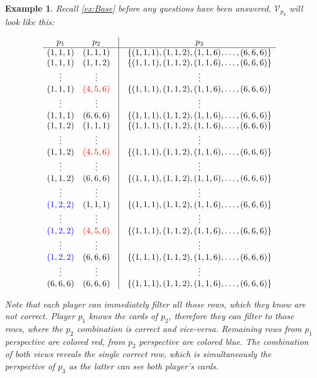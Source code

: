 \documentclass{article}
\newtheorem{example}{Example}[section]
\begin{document}
\begin{example}

Recall \cref{ex:Base} before any questions have been answered. $\mathcal{V}_{p_3}$ will look like this:

\begin{equation*}
\begin{array}{cccc}
p_1 & p_2 & \vline & p_3 \\ \hline
(1,1,1) & (1,1,1) & \vline & \{(1,1,1), (1,1,2), (1,1,6), \ldots, (6,6,6)\} \\
(1,1,1) & (1,1,2) & \vline & \{(1,1,1), (1,1,2), (1,1,6), \ldots, (6,6,6)\} \\
\vdots & \vdots & \vline & \vdots \\
(1,1,1) & \color{red} (4,5,6) & \vline & \{(1,1,1), (1,1,2), (1,1,6), \ldots, (6,6,6)\} \\
\vdots & \vdots & \vline & \vdots \\
(1,1,1) & (6,6,6) & \vline & \{(1,1,1), (1,1,2), (1,1,6), \ldots, (6,6,6)\} \\
(1,1,2) & (1,1,1) & \vline & \{(1,1,1), (1,1,2), (1,1,6), \ldots, (6,6,6)\} \\
\vdots & \vdots & \vline & \vdots \\
(1,1,2) & \color{red} (4,5,6) & \vline & \{(1,1,1), (1,1,2), (1,1,6), \ldots, (6,6,6)\} \\
\vdots & \vdots & \vline & \vdots \\
(1,1,2) & (6,6,6) & \vline & \{(1,1,1), (1,1,2), (1,1,6), \ldots, (6,6,6)\} \\
\vdots & \vdots & \vline & \vdots \\
\color{blue} (1,2,2) & (1,1,1) & \vline & \{(1,1,1), (1,1,2), (1,1,6), \ldots, (6,6,6)\} \\
\vdots & \vdots & \vline & \vdots \\
\color{blue} (1,2,2) & \color{red} (4,5,6) & \vline & \{(1,1,1), (1,1,2), (1,1,6), \ldots, (6,6,6)\} \\
\vdots & \vdots & \vline & \vdots \\
\color{blue} (1,2,2) & (6,6,6) & \vline & \{(1,1,1), (1,1,2), (1,1,6), \ldots, (6,6,6)\} \\
\vdots & \vdots & \vline & \vdots \\
(6,6,6) & (6,6,6) & \vline & \{(1,1,1), (1,1,2), (1,1,6), \ldots, (6,6,6)\} \\
\end{array} 
\end{equation*}

Note that each player can immediately filter all those rows, which they know are not correct. Player $p_1$ knows the cards of $p_2$, therefore they can filter to those rows, where the $p_2$ combination is correct and vice-versa. Remaining rows from $p_1$ perspective are colored red, from $p_2$ perspective are colored blue. The combination of both views reveals the single correct row, which is simultaneously the perspective of $p_3$ as the latter can see both player's cards. 


\end{example}
\end{document}
